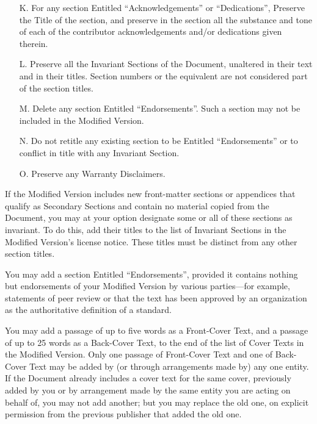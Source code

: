 \documentclass[10pt,a4paper,ngerman,titlepage,tocindentauto]{article}
\begin{document}
\begin{multicols}{3}
{\begin{itemize}
					\item[K.]
						For any section Entitled ``Acknowledgements'' or ``Dedications'',
						Preserve the Title of the section, and preserve in the section all
						the substance and tone of each of the contributor acknowledgements
						and/or dedications given therein.
						
					\item[L.]
						Preserve all the Invariant Sections of the Document,
						unaltered in their text and in their titles.  Section numbers
						or the equivalent are not considered part of the section titles.
						
					\item[M.]
						Delete any section Entitled ``Endorsements''.  Such a section
						may not be included in the Modified Version.
						
					\item[N.]
						Do not retitle any existing section to be Entitled ``Endorsements''
						or to conflict in title with any Invariant Section.
						
					\item[O.]
						Preserve any Warranty Disclaimers.
					\end{itemize}

					If the Modified Version includes new front-matter sections or
					appendices that qualify as Secondary Sections and contain no material
					copied from the Document, you may at your option designate some or all
					of these sections as invariant.  To do this, add their titles to the
					list of Invariant Sections in the Modified Version's license notice.
					These titles must be distinct from any other section titles.

					You may add a section Entitled ``Endorsements'', provided it contains
					nothing but endorsements of your Modified Version by various
					parties---for example, statements of peer review or that the text has
					been approved by an organization as the authoritative definition of a
					standard.

					You may add a passage of up to five words as a Front-Cover Text, and a
					passage of up to 25 words as a Back-Cover Text, to the end of the list
					of Cover Texts in the Modified Version.  Only one passage of
					Front-Cover Text and one of Back-Cover Text may be added by (or
					through arrangements made by) any one entity.  If the Document already
					includes a cover text for the same cover, previously added by you or
					by arrangement made by the same entity you are acting on behalf of,
					you may not add another; but you may replace the old one, on explicit
					permission from the previous publisher that added the old one.

}
\end{multicols}
\end{document}

